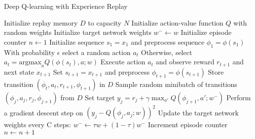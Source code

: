 \documentclass{article}
\begin{document}
\begin{comment}
\begin{algorithm}
\caption{Deep Q-learning with Experience Replay}
\begin{algorithmic}
\State Initialize replay memory $D$ to capacity $N$
\State Initialize action-value function $Q$ with random weights
\For{episode $= 1, M$}
    \State Initialize sequence $s_1 = \{x_1\}$ and preprocessed sequence $\varphi_1 = \varphi(s_1)$
    \For{time step $t = 1, T$}
        \State With probability $\varepsilon$ select a random action $a_t$
        \State otherwise select $a_t = \max_a Q^*(\varphi(s_t), a; \theta)$
        \State Execute action $a_t$ and observe reward $r_t$ and state $x_{t+1}$
        \State Set $s_{t+1} = s_t, a_t, x_{t+1}$ and preprocess $\varphi_{t+1} = \varphi(s_{t+1})$
        \State Store transition $(\varphi_t, a_t, r_t, \varphi_{t+1})$ in $D$
        \State Sample random minibatch of transitions $(\varphi_j , a_j , r_j , \varphi_{j+1})$ from $D$
        \State Set $y_j = \begin{cases}
        r_j & \text{for terminal } \varphi_{j+1} \\
        r_j + \gamma \max_{a_0} Q(\varphi_{j+1}, a_0; \theta) & \text{for non-terminal } \varphi_{j+1}
        \end{cases}$
        \State Perform a gradient descent step on $(y_j - Q(\varphi_j , a_j ; \theta))^2$
    \EndFor
\EndFor
\end{algorithmic}
\end{algorithm}
\end{comment}


\begin{algorithm}
\caption{Deep Q-learning with Experience Replay}
\begin{algorithmic}
\State Initialize replay memory $D$ to capacity $N$
\State Initialize action-value function $Q$ with random weights
\State Initialize target network weights $w^- \leftarrow w$
\State Initialize episode counter $n \leftarrow 1$
    \State Initialize sequence $s_1 = x_1$ and preprocess sequence $\phi_1 = \phi(s_1)$
        \State With probability $\epsilon$ select a random action $a_t$
        \State Otherwise, select $a_t = \text{argmax}_a Q(\phi(s_t), a; w)$
        \State Execute action $a_t$ and observe reward $r_{t+1}$ and next state $x_{t+1}$
        \State Set $s_{t+1} = x_{t+1}$ and preprocess $\phi_{t+1} = \phi(s_{t+1})$
        \State Store transition $(\phi_t, a_t, r_{t+1}, \phi_{t+1})$ in $D$
        \State Sample random minibatch of transitions $(\phi_j, a_j, r_j, \phi_{j+1})$ from $D$
        \State Set target $y_j = r_j + \gamma \max_{a'} Q(\phi_{j+1}, a'; w^-)$
        \State Perform a gradient descent step on $(y_j - Q(\phi_j, a_j; w))^2$
    \EndFor
    \State Update the target network weights every C steps: $w^- \leftarrow \tau w + (1 - \tau) w^-$
    \State Increment episode counter $n \leftarrow n + 1$
\EndFor
\end{algorithmic}
\end{algorithm}
\end{document}
